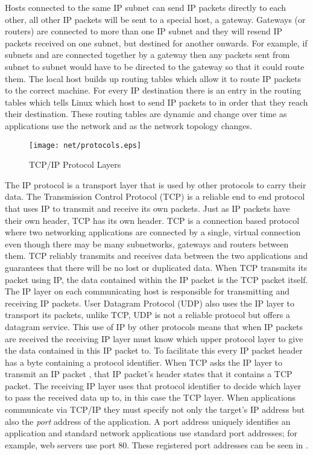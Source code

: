 Hosts connected to the same IP subnet can send IP packets directly to each other, all other IP packets
will be sent to a special host, a gateway.  
Gateways (or routers) are connected to more than one IP subnet and they will resend IP packets
received on one subnet, but destined for another onwards.
For example, if subnets  and  are connected together by a gateway then
any packets sent from subnet  to subnet  would have to be directed to the gateway so that it
could route them.
The local host builds up routing tables which allow it to route IP packets to the correct machine.
For every IP destination there is an entry in the routing tables which tells Linux which host to send 
IP packets to in order that they reach their destination.
These routing tables are dynamic and change over time as applications use the network and as the network
topology changes.

\begin{figure}
\begin{center}
{\centering \texttt{[image: net/protocols.eps]} \par}
\end{center}
\caption{TCP/IP Protocol Layers}
\label{protocols-figure}
\end{figure}
The IP protocol is a transport layer that is used by other protocols to carry their data.
The Transmission Control Protocol (TCP) is a reliable end to end protocol that uses IP to transmit
and receive its own packets.
Just as IP packets have their own header, TCP has its own header.
TCP is a connection based protocol where two networking applications are connected by a single,
virtual connection even  though there may be many subnetworks, gateways and routers between
them.
TCP reliably transmits and receives data between the two applications and guarantees that there will
be no lost or duplicated data.  
When TCP transmits its packet using IP, the data contained within the IP packet is the TCP packet itself.
The IP layer on each communicating host is responsible for transmitting and receiving IP packets.
User Datagram Protocol (UDP) also uses the IP layer to transport its packets, unlike TCP, UDP is not
a reliable protocol but offers a datagram service.
This use of IP by other protocols means that when IP packets are received the receiving IP layer must 
know which upper protocol layer to give the data contained in this IP packet to.
To facilitate this every IP packet header has a byte containing a protocol identifier.
When TCP asks the IP layer to transmit an IP packet , that IP packet's header states that it contains
a TCP packet.
The receiving IP layer uses that protocol identifier to decide which layer to pass the received data
up to, in this case the TCP layer.
When applications communicate via TCP/IP they must specify not only the target's IP address but also the
{\em port} address of the application.
A port address uniquely identifies an application and standard network applications use standard port
addresses; for example, web servers use port 80.
These registered port addresses can be seen in .

